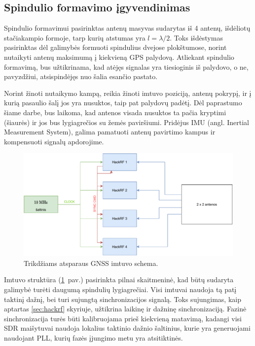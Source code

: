 \documentclass[main.tex]{subfiles}
\begin{document}
\subsection{Spindulio formavimo įgyvendinimas}\label{sec:beamforming_concept}

Spindulio formavimui pasirinktas antenų masyvas sudarytas iš 4 antenų, išdėliotų
sta\-čia\-kam\-pio formoje, tarp kurių atstumas yra $l=\lambda / 2$. Toks
išdėstymas pasirinktas dėl galimybės formuoti spindulius dvejose plokštumose,
norint nutaikyti antenų maksimumą į kiekvieną GPS palydovą.
Atliekant spindulio formavimą, bus užtikrinama, kad atėjęs signalas yra
tiesioginis iš palydovo, o ne, pavyzdžiui, atsispindėjęs nuo šalia esančio pastato.

Norint žinoti nutaikymo kampą, reikia žinoti imtuvo poziciją, antenų pokrypį,
ir į kurią pasaulio šalį jos yra nusuktos, taip pat palydovų padėtį.
Dėl paprastumo šiame darbe,
bus laikoma, kad antenos visada nusuktos ta pačia kryptimi (šiaurės)
ir jos bus lygiagrečios su žemės paviršiumi. Pridėjus IMU (angl. Inertial Measurement
System), galima pamatuoti antenų pavirtimo kampus ir kompensuoti signalų apdorojime.

\begin{figure}[h]
    \begin{centering}
    \includegraphics[scale=0.8]{drawings/beamformer_diagram}
    \par\end{centering}
    \protect\caption{\label{fig:gnss_beamform_block}Trikdžiams atsparaus GNSS imtuvo schema.}
\end{figure}

Imtuvo struktūra (\ref{fig:gnss_beamform_block}~pav.) pasirinkta pilnai skaitmeninė,
kad būtų sudaryta galimybė turėti daugumą
spindulių lygiagrečiai. Visi imtuvai naudoja tą patį taktinį dažnį, bei turi sujungtą
sinchronizacijos signalą. Toks sujungimas, kaip aptartas \ref{sec:hackrf} skyriuje,
užtikrina laikinę ir dažninę sinchronizaciją. Fazinė sinchronizacija turės būti
kalibruojama prieš kiekvieną matavimą, kadangi visi SDR maišytuvai naudoja lokalius
taktinio dažnio šaltinius, kurie yra generuojami naudojant PLL, kurių fazės
įjungimo metu yra atsitiktinės.
\end{document}
